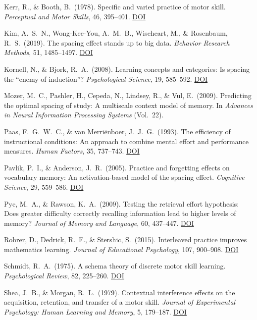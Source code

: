 \documentclass[10pt,twocolumn]{article}
\begin{document}
\noindent Kerr, R., \& Booth, B.\ (1978). Specific and varied practice of motor skill. \textit{Perceptual and Motor Skills}, 46, 395--401. \href{https://doi.org/10.1177/003151257804600201}{DOI}

\noindent Kim, A.\ S.\ N., Wong-Kee-You, A.\ M.\ B., Wiseheart, M., \& Rosenbaum, R.\ S.\ (2019). The spacing effect stands up to big data. \textit{Behavior Research Methods}, 51, 1485--1497. \href{https://doi.org/10.3758/s13428-018-1184-7}{DOI}

\noindent Kornell, N., \& Bjork, R.\ A.\ (2008). Learning concepts and categories: Is spacing the ``enemy of induction''? \textit{Psychological Science}, 19, 585--592. \href{https://doi.org/10.1111/j.1467-9280.2008.02127.x}{DOI}

\noindent Mozer, M.\ C., Pashler, H., Cepeda, N., Lindsey, R., \& Vul, E.\ (2009). Predicting the optimal spacing of study: A multiscale context model of memory. In \textit{Advances in Neural Information Processing Systems} (Vol.\ 22).

\noindent Paas, F.\ G.\ W.\ C., \& van Merri\"{e}nboer, J.\ J.\ G.\ (1993). The efficiency of instructional conditions: An approach to combine mental effort and performance measures. \textit{Human Factors}, 35, 737--743. \href{https://doi.org/10.1177/001872089303500412}{DOI}

\noindent Pavlik, P.\ I., \& Anderson, J.\ R.\ (2005). Practice and forgetting effects on vocabulary memory: An activation-based model of the spacing effect. \textit{Cognitive Science}, 29, 559--586. \href{https://doi.org/10.1207/s15516709cog0000_14}{DOI}

\noindent Pyc, M.\ A., \& Rawson, K.\ A.\ (2009). Testing the retrieval effort hypothesis: Does greater difficulty correctly recalling information lead to higher levels of memory? \textit{Journal of Memory and Language}, 60, 437--447. \href{https://doi.org/10.1016/j.jml.2009.01.004}{DOI}

\noindent Rohrer, D., Dedrick, R.\ F., \& Stershic, S.\ (2015). Interleaved practice improves mathematics learning. \textit{Journal of Educational Psychology}, 107, 900--908. \href{https://doi.org/10.1037/edu0000001}{DOI}

\noindent Schmidt, R.\ A.\ (1975). A schema theory of discrete motor skill learning. \textit{Psychological Review}, 82, 225--260. \href{https://doi.org/10.1037/h0076770}{DOI}

\noindent Shea, J.\ B., \& Morgan, R.\ L.\ (1979). Contextual interference effects on the acquisition, retention, and transfer of a motor skill. \textit{Journal of Experimental Psychology: Human Learning and Memory}, 5, 179--187. \href{https://doi.org/10.1037/0278-7393.5.2.179}{DOI}
\end{document}
